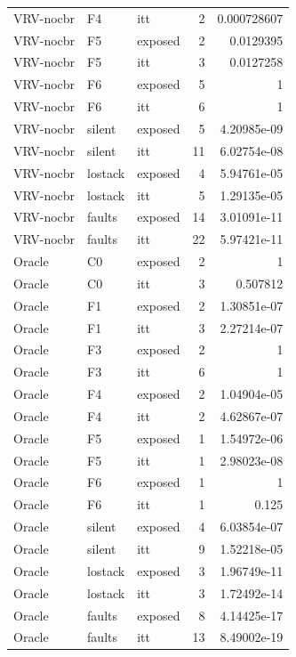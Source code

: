\begin{tabular}{lllrr}
VRV-nocbr & F4 & itt & 2 & 0.000728607 \\
VRV-nocbr & F5 & exposed & 2 & 0.0129395 \\
VRV-nocbr & F5 & itt & 3 & 0.0127258 \\
VRV-nocbr & F6 & exposed & 5 & 1 \\
VRV-nocbr & F6 & itt & 6 & 1 \\
VRV-nocbr & silent & exposed & 5 & 4.20985e-09 \\
VRV-nocbr & silent & itt & 11 & 6.02754e-08 \\
VRV-nocbr & lostack & exposed & 4 & 5.94761e-05 \\
VRV-nocbr & lostack & itt & 5 & 1.29135e-05 \\
VRV-nocbr & faults & exposed & 14 & 3.01091e-11 \\
VRV-nocbr & faults & itt & 22 & 5.97421e-11 \\
Oracle & C0 & exposed & 2 & 1 \\
Oracle & C0 & itt & 3 & 0.507812 \\
Oracle & F1 & exposed & 2 & 1.30851e-07 \\
Oracle & F1 & itt & 3 & 2.27214e-07 \\
Oracle & F3 & exposed & 2 & 1 \\
Oracle & F3 & itt & 6 & 1 \\
Oracle & F4 & exposed & 2 & 1.04904e-05 \\
Oracle & F4 & itt & 2 & 4.62867e-07 \\
Oracle & F5 & exposed & 1 & 1.54972e-06 \\
Oracle & F5 & itt & 1 & 2.98023e-08 \\
Oracle & F6 & exposed & 1 & 1 \\
Oracle & F6 & itt & 1 & 0.125 \\
Oracle & silent & exposed & 4 & 6.03854e-07 \\
Oracle & silent & itt & 9 & 1.52218e-05 \\
Oracle & lostack & exposed & 3 & 1.96749e-11 \\
Oracle & lostack & itt & 3 & 1.72492e-14 \\
Oracle & faults & exposed & 8 & 4.14425e-17 \\
Oracle & faults & itt & 13 & 8.49002e-19 \\
\bottomrule
\end{tabular}
